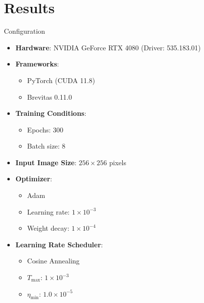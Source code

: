 \documentclass[aspectratio=169,xcolor=dvipsnames]{beamer}
\newcommand{\itemvtab}{\setlength{\itemsep}{0.3cm}}
\begin{document}
\section{Results}

\begin{frame}{Configuration}
    \begin{multicols}{2}
        \begin{itemize}
            \itemvtab
            \item \textbf{Hardware}: NVIDIA GeForce RTX 4080 (Driver: 535.183.01)
            \item \textbf{Frameworks}: 
            \begin{itemize}
                \item PyTorch (CUDA 11.8)
                \item Brevitas 0.11.0 \cite{brevitas}
            \end{itemize}
            
            \item \textbf{Training Conditions}:
            \begin{itemize}
                \item Epochs: 300
                \item Batch size: 8
            \end{itemize}
            \item \textbf{Input Image Size}: $256 \times 256$ pixels
            \item \textbf{Optimizer}: 
            \begin{itemize}
                \item Adam
                \item Learning rate: $1 \times 10^{-3}$
                \item Weight decay: $1 \times 10^{-4}$
            \end{itemize}
            \item \textbf{Learning Rate Scheduler}: 
            \begin{itemize}
                \item Cosine Annealing
                \item $T_{\text{max}}$: $1 \times 10^{-3}$
                \item $\eta_{\text{min}}$: $1.0 \times 10^{-5}$
            \end{itemize}
        \end{itemize}
    \end{multicols}
\end{frame}
\end{document}
